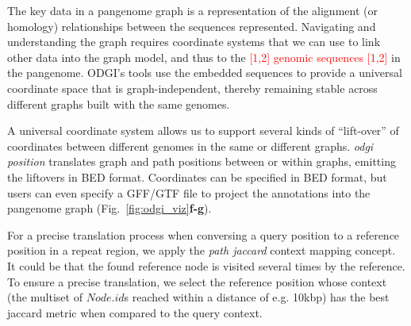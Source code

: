 \documentclass{bioinfo}
\newcommand{\REVIEWED}[1]{{\textcolor{Red}{#1}}}
\begin{document}
The key data in a pangenome graph is a representation of the alignment (or homology) relationships between the sequences represented.
Navigating and understanding the graph requires coordinate systems that we can use to link other data into the graph model, and thus to the \REVIEWED{[1,2] genomic sequences [1,2]} in the pangenome.
ODGI's tools use the embedded sequences to provide a universal coordinate space that is graph-independent, thereby remaining stable across different graphs built with the same genomes.

A universal coordinate system allows us to support several kinds of ``lift-over'' of coordinates between different genomes in the same or different graphs.
\textit{odgi position} translates graph and path positions between or within graphs, emitting the liftovers in BED format.
Coordinates can be specified in BED format, but users can even specify a GFF/GTF file to project the annotations into the pangenome graph (Fig.~\ref{fig:odgi_viz}\textbf{f-g}). 

For a precise translation process when conversing a query position to a reference position in a repeat region, we apply the \textit{path jaccard} context mapping concept.
It could be that the found reference node is visited several times by the reference.
To ensure a precise translation, we select the reference position whose context (the multiset of $Node.id$s reached within a distance of e.g. 10kbp) has the best jaccard metric when compared to the query context.

\end{document}
